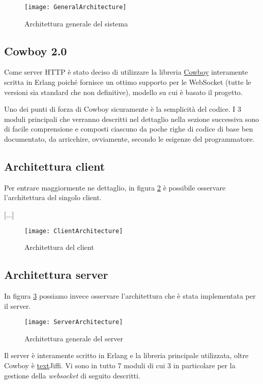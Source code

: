 \documentclass[paper=a4, fontsize=11pt]{scrartcl} %
\numberwithin{equation}{section} %
\numberwithin{figure}{section} %
\numberwithin{table}{section} %
\begin{document}
\begin{figure}
\centering
\texttt{[image: GeneralArchitecture]}
\caption{Architettura generale del sistema}
\label{GenArc}
\end{figure}

\subsection{Cowboy 2.0}
Come server HTTP è stato deciso di utilizzare la libreria \href{https://github.com/ninenines/cowboy}{Cowboy} interamente scritta in Erlang poiché fornisce un ottimo supporto per le WebSocket (tutte le versioni sia standard che non definitive), modello su cui è basato il progetto.

Uno dei punti di forza di Cowboy sicuramente è la semplicità del codice. I 3 moduli principali che verranno descritti nel dettaglio nella sezione successiva sono di facile comprensione e composti ciascuno da poche righe di codice di base ben documentato, da arricchire, ovviamente, secondo le esigenze del programmatore.

\subsection{Architettura client}
Per entrare maggiormente ne dettaglio, in figura \ref{ClientArc} è possibile osservare l'architettura del singolo client.

[...]

\begin{figure}
\centering
\texttt{[image: ClientArchitecture]}
\caption{Architettura del client}
\label{ClientArc}
\end{figure}

\subsection{Architettura server}
In figura \ref{ServerArc} possiamo invece osservare l'architettura che è stata implementata per il server.

\begin{figure}
\centering
\texttt{[image: ServerArchitecture]}
\caption{Architettura generale del server}
\label{ServerArc}
\end{figure}

Il server è interamente scritto in Erlang e la libreria principale utilizzata, oltre Cowboy è \href{https://github.com/davisp/jiffy}{text}{Jiffi}. Vi sono in tutto 7 moduli di cui 3 in particolare per la gestione della \textit{websocket} di seguito descritti.
\end{document}
